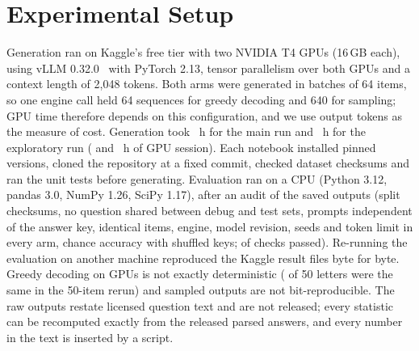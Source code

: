 \section{Experimental Setup}\label{sec:setup}
Generation ran on Kaggle's free tier with two NVIDIA T4 GPUs (16\,GB each), using vLLM 0.32.0~\cite{kwon2023vllm}
with PyTorch 2.13, tensor parallelism over both GPUs and a context length of 2{,}048 tokens. Both arms were generated
in batches of 64 items, so one engine call held 64 sequences for greedy decoding and 640 for sampling; GPU time
therefore depends on this configuration, and we use output tokens as the measure of cost. Generation took
\genHoursMain{}~h for the main run and \genHoursExtras{}~h for the exploratory run (\sessionHoursMain{} and
\sessionHoursExtras{}~h of GPU session). Each notebook installed pinned versions, cloned the repository at a fixed
commit, checked dataset checksums and ran the unit tests before generating. Evaluation ran on a CPU (Python 3.12,
pandas 3.0, NumPy 1.26, SciPy 1.17), after an audit of the saved outputs (split checksums, no question shared between
debug and test sets, prompts independent of the answer key, identical items, engine, model revision, seeds and token
limit in every arm, chance accuracy with shuffled keys; \auditTotal{} of \auditTotal{} checks passed). Re-running the
evaluation on another machine reproduced the Kaggle result files byte for byte. Greedy decoding on GPUs is not exactly
deterministic (\rerunFiftySame{} of 50 letters were the same in the 50-item rerun) and sampled outputs are not
bit-reproducible. The raw outputs restate licensed question text and are not released; every statistic can be
recomputed exactly from the released parsed answers, and every number in the text is inserted by a script.
